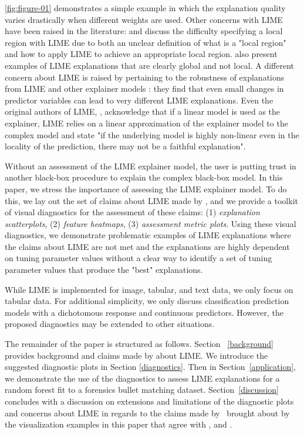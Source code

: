 \documentclass[AMS,STIX2COL]{WileyNJD-v2}\usepackage[]{graphicx}\usepackage[]{color}
\begin{document}
\autoref{fig:figure-01} demonstrates a simple example in which the explanation quality varies drastically when different weights are used. Other concerns with LIME have been raised in the literature: \citet{laugel:2018} and \citet{molnar:2019} discuss the difficulty specifying a local region with LIME due to both  an unclear definition of what is a "local region" and how to apply LIME to achieve an appropriate local region. \citet{laugel:2018} also present examples of LIME explanations that are clearly global and not local. A different concern about LIME is raised by \citet{alvarezmelis:2018}  pertaining to the robustness of explanations from LIME and other explainer models : they find that even small changes in predictor variables can lead to very different LIME explanations. Even the original authors of LIME,  \citet{ribeiro:2016}, acknowledge that if a linear model is used as the explainer, LIME relies on a linear approximation of the explainer model to the complex model and state "if the underlying model is highly non-linear even in the locality of the prediction, there may not be a faithful explanation".

 Without an assessment of the LIME explainer model, the user is putting trust in another black-box procedure to explain the complex black-box model. In this paper, we stress the importance of assessing the LIME explainer model. To do this, we lay out the set of claims about LIME made by \citet{ribeiro:2016}, and we provide a toolkit of visual diagnostics  for the assessment of these claims: (1) \emph{explanation scatterplots}, (2) \emph{feature heatmaps}, (3) \emph{assessment metric plots}. Using these visual diagnostics, we demonstrate problematic examples of LIME explanations where the claims about LIME are not met and the explanations are highly dependent on tuning parameter values without a clear way to identify a set of tuning parameter values that produce the "best" explanations.

While LIME is implemented for image, tabular, and text data, we only focus on tabular data. For additional simplicity, we only discuss classification prediction models with a dichotomous response  and continuous predictors. However, the proposed diagnostics may be extended to other  situations.

The remainder of the paper is structured as follows. Section ~\ref{background} provides background and claims made by \citet{ribeiro:2016} about LIME. We introduce the suggested diagnostic plots in Section \ref{diagnostics}. Then in Section~\ref{application}, we demonstrate the use of the diagnostics to assess LIME explanations for a random forest  fit to a forensics bullet matching dataset. Section~\ref{discussion} concludes with a discussion on extensions and limitations of the diagnostic plots and concerns about LIME in regards to the claims made by~\citet{ribeiro:2016} brought about by the visualization examples in this paper that agree with \citet{alvarezmelis:2018, laugel:2018}, and \citet{molnar:2019}.
\end{document}
